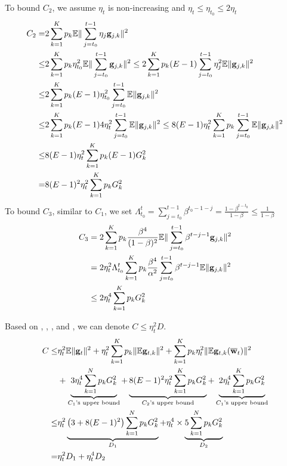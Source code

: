 To bound $C_2$, we assume $\eta_t$ is non-increasing and $\eta_t  \leq \eta_{t_0}  \leq 2 \eta_t$
\begin{align}
 C_2 = & 2\sum_{k=1}^K p_k \mathbb{E} \|\sum_{j=t_0}^{t-1}\eta_j {\mathbf{g}}_{j,k}\|^2\\
 \leq& 2\sum_{k=1}^K p_k \eta_{t_0}^2 \mathbb{E} \|\sum_{j=t_0}^{t-1} {\mathbf{g}}_{j,k}\|^2
 \leq 2\sum_{k=1}^K p_k  (E-1)\sum_{j=t_0}^{t-1}\eta_{j}^2 \mathbb{E} \| {\mathbf{g}}_{j,k}\|^2\\
 \leq & 2\sum_{k=1}^K p_k  (E-1)\eta_{t_0}^2 \sum_{j=t_0}^{t-1} \mathbb{E} \| {\mathbf{g}}_{j,k}\|^2\\
 \leq & 2\sum_{k=1}^K p_k  (E-1)4\eta_{t}^2 \sum_{j=t_0}^{t-1} \mathbb{E} \| {\mathbf{g}}_{j,k}\|^2 \leq 8(E-1)\eta_{t}^2 \sum_{k=1}^K p_k \sum_{j=t_0}^{t-1} \mathbb{E} \| {\mathbf{g}}_{j,k}\|^2 \\
 \leq & 8(E-1)\eta_{t}^2 \sum_{k=1}^K p_k (E-1)G_k^2 \\
 =  & 8(E-1)^2\eta_{t}^2 \sum_{k=1}^K p_k G_k^2   \label{eq:nagcvxc2}
\end{align}
To bound $C_3$, similar to $C_1$, we set $\Lambda_{t_0}^{t} = \sum_{j=t_0}^{t - 1}\beta^{t_0-1-j} =  \frac{1 - \beta^{t-t_0}}{1- \beta} \leq \frac{1}{1 - \beta} $
\begin{align}
	C_3 & = 2\sum_{k=1}^K p_k \frac{\beta^4}{(1 - \beta)^2} \mathbb{E}\|\sum_{j=t_0}^{t-1}\beta^{t-j-1}{\mathbf{g}}_{j,k}\|^2\\
        & = 2\eta_t^2 \Lambda_{t_0}^{t}\sum_{k=1}^K p_k \frac{\beta^4}{\alpha^2} \sum_{j=t_0}^{t-1}\beta^{t-j-1} \mathbb{E}\|{\mathbf{g}}_{j,k}\|^2 \\
        & \leq 2 \eta_t^4 \sum_{k=1}^K p_k G_k^2  \label{eq:nagcvxc3}
\end{align}

Based on \eq{\ref{eq:nagcvxc}}, \eq{\ref{eq:nagcvxc1}}, \eq{\ref{eq:nagcvxc2}}, and \eq{\ref{eq:nagcvxc3}}, we can denote $C \leq \eta_t^2 D$.
\begin{align}
	C \leq& \eta_t^2\mathbb{E}\|{\mathbf{g}}_t\|^2 +\eta^2_t \sum_{k=1}^K p_k\|\mathbb{E} {\mathbf{g}}_{t,k}\|^2+ \sum_{k=1}^K p_k \eta_t^2 \|\mathbb{E} {\mathbf{g}}_{t,k}(\overline{{\mathbf{w}}}_t)\|^2  \nonumber \\
	& + \underbrace{3 \eta_t^4\sum_{k=1}^N p_k G_k^2}_{C_1\text{'s upper bound}} + \underbrace{8(E-1)^2\eta_{t}^2 \sum_{k=1}^K p_k G_k^2}_{C_2\text{'s upper bound}} + \underbrace{2 \eta_t^4 \sum_{k=1}^K p_k G_k^2 }_{C_1\text{'s upper bound}} \\
	  \leq & \eta_t^2 \underbrace{\left(3 + 8(E-1)^2\right)\sum_{k=1}^N p_k G_k^2}_{D_1}   + \eta_t^4 \times \underbrace{5 \sum_{k=1}^N p_k G_k^2}_{D_2} \\
	  = &  \eta_t^2 D_1 + \eta_t^4 D_2 
\end{align}


